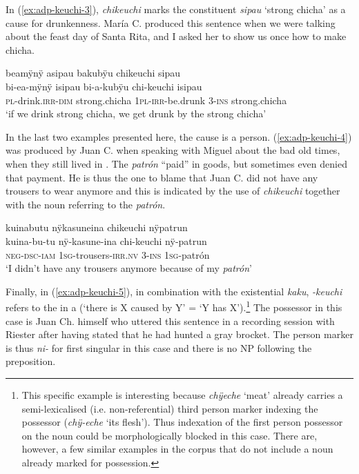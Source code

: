 In (\ref{ex:adp-keuchi-3}), \textit{chikeuchi} marks the constituent \textit{sipau} ‘strong chicha’ as a cause for drunkenness. María C. produced this sentence when we were talking about the feast day of Santa Rita, and I asked her to show us once how to make chicha. 

\ea\label{ex:adp-keuchi-3}
\begingl
\glpreamble beamÿnÿ asipau bakubÿu chikeuchi sipau\\
\gla bi-ea-mÿnÿ isipau bi-a-kubÿu chi-keuchi isipau\\
\textsc{pl}-drink.\textsc{irr}-\textsc{dim} strong.chicha 1\textsc{pl}-\textsc{irr}-be.drunk 3-\textsc{ins} strong.chicha\\
\glft ‘if we drink strong chicha, we get drunk by the strong chicha’
\endgl
\trailingcitation{[uxx-p110825l.296]}
\xe

In the last two examples presented here, the cause is a person. (\ref{ex:adp-keuchi-4}) was produced by Juan C. when speaking with Miguel about the bad old times, when they still lived in . The \textit{patrón} “paid” in goods, but sometimes even denied that payment. He is thus the one to blame that Juan C. did not have any trousers to wear anymore and this is indicated by the use of \textit{chikeuchi} together with the noun referring to the \textit{patrón}.

\ea\label{ex:adp-keuchi-4}
\begingl
\glpreamble kuinabutu nÿkasuneina chikeuchi nÿpatrun\\
\gla kuina-bu-tu nÿ-kasune-ina chi-keuchi nÿ-patrun\\
\glb \textsc{neg}-\textsc{dsc}-\textsc{iam} 1\textsc{sg}-trousers-\textsc{irr.nv} 3-\textsc{ins} 1\textsc{sg}-patrón\\
\glft ‘I didn’t have any trousers anymore because of my \textit{patrón}’
\endgl
\trailingcitation{[mqx-p110826l.454]}
\xe

Finally, in (\ref{ex:adp-keuchi-5}), in combination with the existential  \textit{kaku}, \textit{-keuchi} refers to the  in a  (‘there is X caused by Y’ = ‘Y has X’).\footnote{This specific example is interesting because \textit{chÿeche} ‘meat’ already carries a semi-lexicalised (i.e. non-referential) third person marker indexing the possessor (\textit{chÿ-eche} ‘its flesh’). Thus indexation of the first person possessor on the noun could be morphologically blocked in this case. There are, however, a few similar examples in the corpus that do not include a noun already marked for possession.} The possessor in this case is Juan Ch. himself who uttered this sentence in a recording session with Riester after having stated that he had hunted a gray brocket. The person marker is thus \textit{ni-} for first singular in this case and there is no NP following the preposition.

